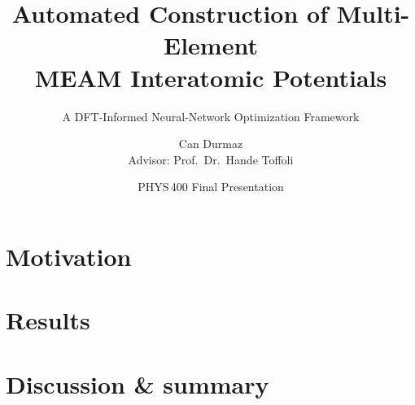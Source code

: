 \documentclass[aspectratio=169, 10pt]{beamer}
\title[MEAM-NN Final]{Automated Construction of Multi-Element\\MEAM Interatomic Potentials}
\subtitle{A DFT-Informed Neural-Network Optimization Framework}
\author[Can Durmaz]{Can Durmaz\\[2pt]{\small Advisor: Prof.\ Dr.\ Hande Toffoli}}
\institute{METU, Department of Physics}
\date{PHYS\,400 Final Presentation}
\begin{document}


\section{Motivation}






\section{Results}


\section{Discussion \& summary}


\end{document}
